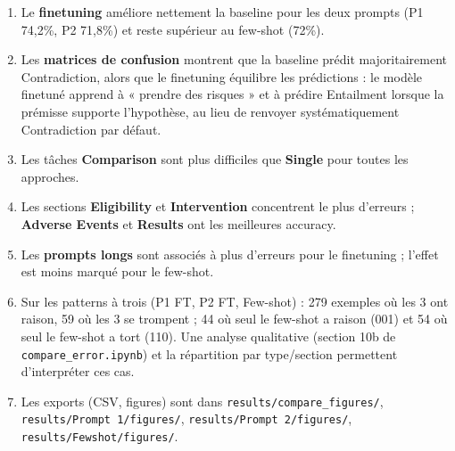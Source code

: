 \documentclass[11pt,a4paper]{article}
\begin{document}
\begin{enumerate}
  \item Le \textbf{finetuning} améliore nettement la baseline pour les deux prompts (P1 74,2\%, P2 71,8\%) et reste supérieur au few-shot (72\%).
  \item Les \textbf{matrices de confusion} montrent que la baseline prédit majoritairement Contradiction, alors que le finetuning équilibre les prédictions : le modèle finetuné apprend à « prendre des risques » et à prédire Entailment lorsque la prémisse supporte l'hypothèse, au lieu de renvoyer systématiquement Contradiction par défaut.
  \item Les tâches \textbf{Comparison} sont plus difficiles que \textbf{Single} pour toutes les approches.
  \item Les sections \textbf{Eligibility} et \textbf{Intervention} concentrent le plus d’erreurs ; \textbf{Adverse Events} et \textbf{Results} ont les meilleures accuracy.
  \item Les \textbf{prompts longs} sont associés à plus d’erreurs pour le finetuning ; l’effet est moins marqué pour le few-shot.
  \item Sur les patterns à trois (P1 FT, P2 FT, Few-shot) : 279 exemples où les 3 ont raison, 59 où les 3 se trompent ; 44 où seul le few-shot a raison (001) et 54 où seul le few-shot a tort (110). Une analyse qualitative (section 10b de \texttt{compare\_error.ipynb}) et la répartition par type/section permettent d’interpréter ces cas.
  \item Les exports (CSV, figures) sont dans \texttt{results/compare\_figures/}, \texttt{results/Prompt 1/figures/}, \texttt{results/Prompt 2/figures/}, \texttt{results/Fewshot/figures/}.
\end{enumerate}
\end{document}
